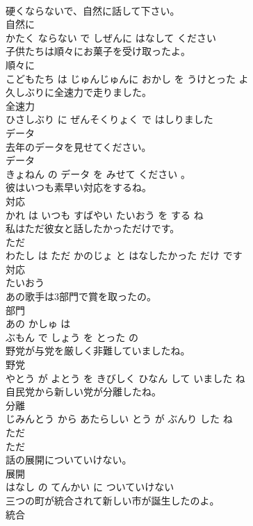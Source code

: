 \documentclass[8pt]{extreport}
\begin{document}
\begin{CJK}{UTF8}{min}
\\	硬くならないで、自然に話して下さい。	
\\	自然に 
\\	かたく ならない で しぜんに はなして ください			
\\	子供たちは順々にお菓子を受け取ったよ。	
\\	順々に 
\\	こどもたち は じゅんじゅんに おかし を うけとった よ			
\\	久しぶりに全速力で走りました。	
\\	全速力 
\\	ひさしぶり に ぜんそくりょく で はしりました			
\\	データ	
\\	去年のデータを見せてください。	
\\	データ 
\\	きょねん の データ を みせて ください 。			
\\	彼はいつも素早い対応をするね。	
\\	対応 
\\	かれ は いつも すばやい たいおう を する ね			
\\	私はただ彼女と話したかっただけです。	
\\	ただ 
\\	わたし は ただ かのじょ と はなしたかった だけ です			
\\	対応	
\\	たいおう		
\\	あの歌手は3部門で賞を取ったの。	
\\	部門 
\\	あの かしゅ は 
\\	ぶもん で しょう を とった の			
\\	野党が与党を厳しく非難していましたね。	
\\	野党 
\\	やとう が よとう を きびしく ひなん して いました ね			
\\	自民党から新しい党が分離したね。	
\\	分離 
\\	じみんとう から あたらしい とう が ぶんり した ね			
\\	ただ	
\\	ただ		
\\	話の展開についていけない。	
\\	展開 
\\	はなし の てんかい に ついていけない			
\\	三つの町が統合されて新しい市が誕生したのよ。	
\\	統合 

\end{CJK}
\end{document}
